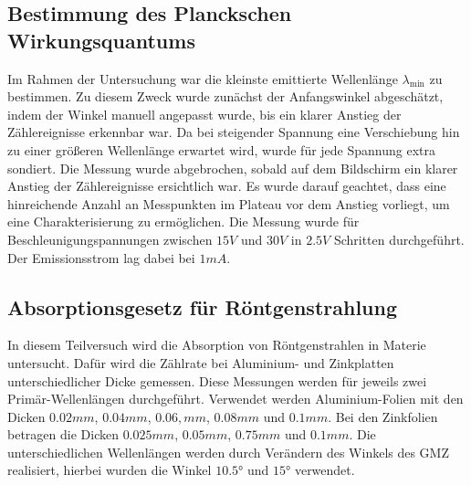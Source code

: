 \subsection{Bestimmung des Planckschen Wirkungsquantums}

Im Rahmen der Untersuchung war die kleinste emittierte Wellenlänge $\lambda_\mathrm{min}$ zu bestimmen. Zu diesem Zweck wurde zunächst der Anfangswinkel abgeschätzt, indem der Winkel manuell angepasst wurde, bis ein klarer Anstieg der Zählereignisse erkennbar war. Da bei steigender Spannung eine Verschiebung hin zu einer größeren Wellenlänge erwartet wird, wurde für jede Spannung extra sondiert. Die Messung wurde abgebrochen, sobald auf dem Bildschirm ein klarer Anstieg der Zählereignisse ersichtlich war. Es wurde darauf geachtet, dass eine hinreichende Anzahl an Messpunkten im Plateau vor dem Anstieg vorliegt, um eine Charakterisierung zu ermöglichen.  Die Messung wurde für Beschleunigungspannungen zwischen $15 \unit{V}$ und $30 \unit{V}$ in $2.5 \unit{V}$ Schritten durchgeführt. Der Emissionsstrom lag dabei bei $1 \unit{mA}$. 

\subsection{Absorptionsgesetz für Röntgenstrahlung}

In diesem Teilversuch wird die Absorption von Röntgenstrahlen in Materie untersucht. Dafür wird die Zählrate bei Aluminium- und Zinkplatten unterschiedlicher Dicke gemessen. Diese Messungen werden für jeweils zwei Primär-Wellenlängen durchgeführt. Verwendet werden Aluminium-Folien mit den Dicken $0.02 \unit{mm}$, $0.04 \unit{mm}$, $0.06,  \unit{mm}$, $0.08 \unit{mm}$ und $0.1 \unit{mm}$. Bei den Zinkfolien betragen die Dicken $0.025 \unit{mm}$, $0.05 \unit{mm}$, $0.75 \unit{mm}$ und $0.1 \unit{mm}$. Die unterschiedlichen Wellenlängen werden durch Verändern des Winkels des GMZ realisiert, hierbei wurden die Winkel $ \ang{10.5}$ und $\ang{15}$ verwendet. 

